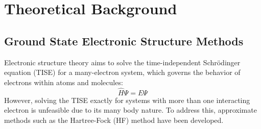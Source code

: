 \chapter{Theoretical Background}\label{ch:theory}

\section{Ground State Electronic Structure Methods} \label{sec:SCF}
Electronic structure theory aims to solve the time-independent Schrödinger equation (TISE) for a many-electron system, which governs the behavior of electrons within atoms and molecules:
\begin{equation}\label{eq:TISE}
    \hat{H} \Psi = E \Psi
\end{equation}
However, solving the TISE exactly for systems with more than one interacting electron is unfeasible due to its many body nature. To address this, approximate methods such as the Hartree-Fock (HF) method have been developed\cite{hartree1928wave,fock1930naherungsmethode}.\\

